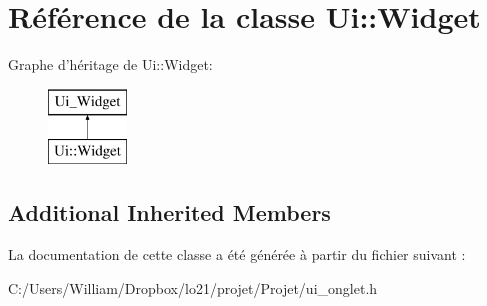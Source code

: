 \hypertarget{class_ui_1_1_widget}{\section{Référence de la classe Ui\-:\-:Widget}
\label{class_ui_1_1_widget}
}
Graphe d'héritage de Ui\-:\-:Widget\-:\begin{figure}[H]
\begin{center}
\leavevmode
\includegraphics[height=2.000000cm]{class_ui_1_1_widget}
\end{center}
\end{figure}
\subsection*{Additional Inherited Members}


La documentation de cette classe a été générée à partir du fichier suivant \-:\begin{DoxyCompactItemize}
\item 
C\-:/\-Users/\-William/\-Dropbox/lo21/projet/\-Projet/ui\-\_\-onglet.\-h\end{DoxyCompactItemize}
